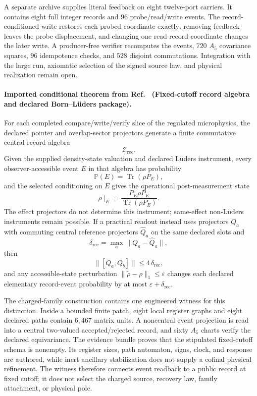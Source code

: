 A separate archive supplies literal feedback on eight twelve-port carriers.
It contains eight full integer records and \(96\) probe/read/write events. The
record-conditioned write restores each probed coordinate exactly; removing
feedback leaves the probe displacement, and changing one read record
coordinate changes the later write. A producer-free verifier recomputes the
events, \(720\) \(A_5\) covariance squares, \(96\) idempotence checks, and
\(528\) disjoint commutations. Integration with the large run, axiomatic
selection of the signed source law, and physical realization remain open.

\paragraph{Imported conditional theorem from Ref.~\cite{ophmicrophysics} (Fixed-cutoff record algebra and declared Born--L\"uders package).}
For each completed compare/write/verify slice of the regulated microphysics, the declared pointer
and overlap-sector projectors generate a finite commutative central record algebra
\[
\mathcal Z_{\mathrm{rec}}.
\]
Given the supplied density-state valuation and declared L\"uders instrument,
every observer-accessible event \(E\) in that algebra has probability
\[
\mathbb P(E)=\operatorname{Tr}(\rho P_E),
\]
and the selected conditioning on \(E\) gives the operational post-measurement state
\[
\rho\!\mid_E = \frac{P_E \rho P_E}{\operatorname{Tr}(\rho P_E)}.
\]
The effect projectors do not determine this instrument; same-effect
non-L\"uders instruments remain possible.
If a practical readout instead uses projectors \(Q_a\) with commuting central reference
projectors \(\widehat Q_a\) on the same declared slots and
\[
\delta_{\mathrm{rec}}=\max_a \|Q_a-\widehat Q_a\|,
\]
then
\[
\|[Q_a,Q_b]\|\le 4\,\delta_{\mathrm{rec}},
\]
and any accessible-state perturbation \(\|\widetilde\rho-\rho\|_1\le\varepsilon\) changes each
declared elementary record-event probability by at most \(\varepsilon+\delta_{\mathrm{rec}}\).

The charged-family construction contains one engineered witness for this distinction. Inside a bounded
finite patch, eight local register graphs and eight declared paths contain \(6{,}467\) matrix
units. A noncentral event projection is read into a central two-valued accepted/rejected record,
and sixty \(A_5\) charts verify the declared equivariance. The evidence bundle proves that the
stipulated fixed-cutoff schema is nonempty. Its register sizes, path automaton, signs, clock, and
response are authored, while inert ancillary stabilization does not supply a cofinal physical
refinement. The witness therefore connects event readback to a public record at fixed cutoff; it
does not select the charged source, recovery law, family attachment, or physical pole.

